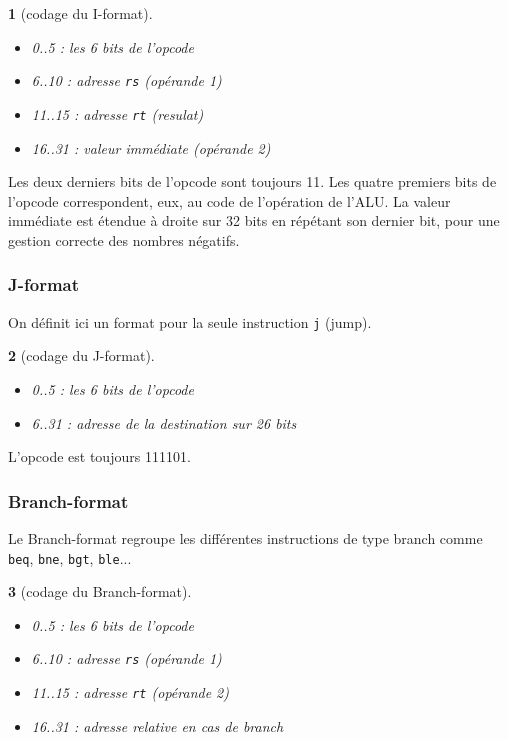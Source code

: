 \documentclass[13pt]{article}
\newtheorem{format}{  }
\begin{document}
\begin{format}[codage du I-format]
  \begin{itemize}
  \item 0..5 : les 6 bits de l'opcode
  \item 6..10 : adresse \texttt{rs} (opérande 1)
  \item 11..15 : adresse \texttt{rt} (resulat)
  \item 16..31 : valeur immédiate (opérande 2)
  \end{itemize}
\end{format}

Les deux derniers bits de l'opcode sont toujours 11.
Les quatre premiers bits de l'opcode correspondent, eux, au code
de l'opération de l'ALU. La valeur immédiate est étendue à droite sur 
32 bits en répétant son dernier bit, pour une gestion correcte des nombres
négatifs.

\subsubsection{J-format}

On définit ici un format pour la seule instruction \texttt{j} (jump).

\begin{format}[codage du J-format]
  \begin{itemize}
  \item 0..5 : les 6 bits de l'opcode
  \item 6..31 : adresse de la destination sur 26 bits
  \end{itemize}
\end{format}

L'opcode est toujours 111101. 

\subsubsection{Branch-format}

Le Branch-format regroupe les différentes instructions de type branch comme
\texttt{beq}, \texttt{bne}, \texttt{bgt}, \texttt{ble}...

\begin{format}[codage du Branch-format]
  \begin{itemize}
  \item 0..5 : les 6 bits de l'opcode
  \item 6..10 : adresse \texttt{rs} (opérande 1)
  \item 11..15 : adresse \texttt{rt} (opérande 2)
  \item 16..31 : adresse relative en cas de branch
  \end{itemize}
\end{format}
\end{document}
